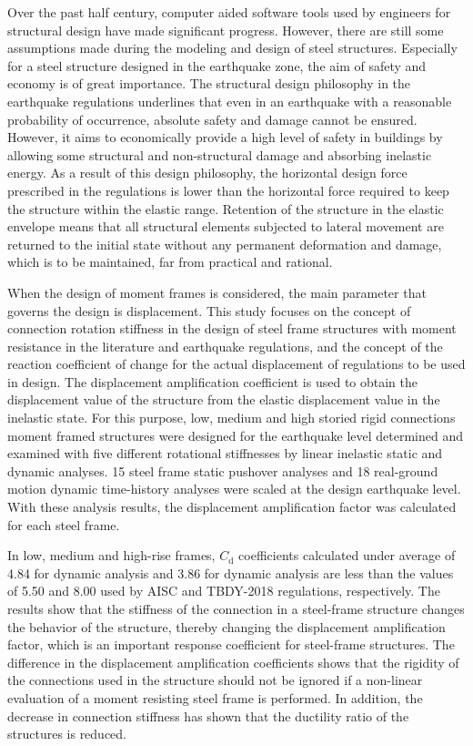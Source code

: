 Over the past half century, computer aided software tools used by
engineers for structural design have made significant progress. However,
there are still some assumptions made during the modeling and design
of steel structures. Especially for a steel structure designed in
the earthquake zone, the aim of safety and economy is of great importance.
The structural design philosophy in the earthquake regulations underlines
that even in an earthquake with a reasonable probability of occurrence,
absolute safety and damage cannot be ensured. However, it aims to
economically provide a high level of safety in buildings by allowing
some structural and non-structural damage and absorbing inelastic
energy. As a result of this design philosophy, the horizontal design
force prescribed in the regulations is lower than the horizontal force
required to keep the structure within the elastic range. Retention
of the structure in the elastic envelope means that all structural
elements subjected to lateral movement are returned to the initial
state without any permanent deformation and damage, which is to be
maintained, far from practical and rational. 

When the design of moment frames is considered, the main parameter
that governs the design is displacement. This study focuses on the
concept of connection rotation stiffness in the design of steel frame
structures with moment resistance in the literature and earthquake
regulations, and the concept of the reaction coefficient of change
for the actual displacement of regulations to be used in design. The
displacement amplification coefficient is used to obtain the displacement
value of the structure from the elastic displacement value in the
inelastic state. For this purpose, low, medium and high storied rigid
connections moment framed structures were designed for the earthquake
level determined and examined with five different rotational stiffnesses
by linear inelastic static and dynamic analyses. 15 steel frame static
pushover analyses and 18 real-ground motion dynamic time-history analyses
were scaled at the design earthquake level. With these analysis results,
the displacement amplification factor was calculated for each steel
frame.

In low, medium and high-rise frames, $C_{\mathrm{d}}$ coefficients
calculated under average of 4.84 for dynamic analysis and 3.86 for
dynamic analysis are less than the values of 5.50 and 8.00 used by
AISC and TBDY-2018 regulations, respectively. The results show that
the stiffness of the connection in a steel-frame structure changes
the behavior of the structure, thereby changing the displacement amplification
factor, which is an important response coefficient for steel-frame
structures. The difference in the displacement amplification coefficients
shows that the rigidity of the connections used in the structure should
not be ignored if a non-linear evaluation of a moment resisting steel
frame is performed. In addition, the decrease in connection stiffness
has shown that the ductility ratio of the structures is reduced.
